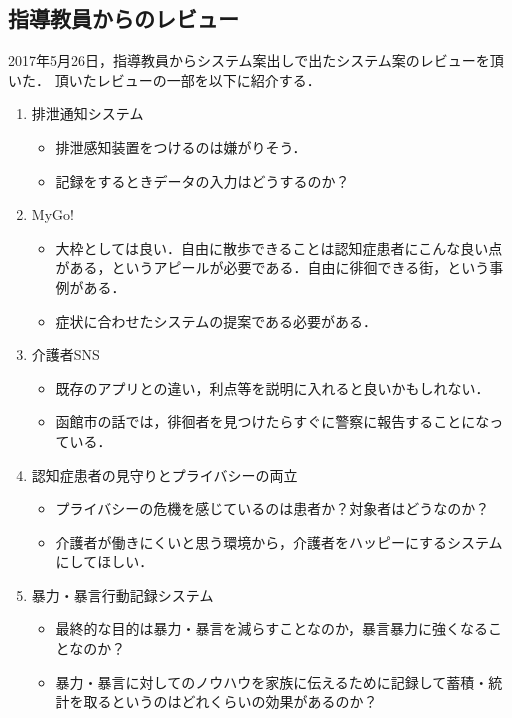 \documentclass[../report]{subfiles}
\begin{document}
\subsection{指導教員からのレビュー}
2017年5月26日，指導教員からシステム案出しで出たシステム案のレビューを頂いた．
頂いたレビューの一部を以下に紹介する．
\begin{enumerate}
    \item 排泄通知システム
        \begin{itemize}
            \item 排泄感知装置をつけるのは嫌がりそう．
            \item 記録をするときデータの入力はどうするのか？
        \end{itemize}
    \item MyGo!
        \begin{itemize}
            \item 大枠としては良い．自由に散歩できることは認知症患者にこんな良い点がある，というアピールが必要である．自由に徘徊できる街，という事例がある\cite{haikai}．
            \item 症状に合わせたシステムの提案である必要がある．
        \end{itemize}
    \item 介護者SNS
        \begin{itemize}
            \item 既存のアプリとの違い，利点等を説明に入れると良いかもしれない．
            \item 函館市の話では，徘徊者を見つけたらすぐに警察に報告することになっている．
        \end{itemize}
    \item 認知症患者の見守りとプライバシーの両立
        \begin{itemize}
            \item プライバシーの危機を感じているのは患者か？対象者はどうなのか？
            \item 介護者が働きにくいと思う環境から，介護者をハッピーにするシステムにしてほしい．
        \end{itemize}
    \item 暴力・暴言行動記録システム
        \begin{itemize}
            \item 最終的な目的は暴力・暴言を減らすことなのか，暴言暴力に強くなることなのか？
            \item 暴力・暴言に対してのノウハウを家族に伝えるために記録して蓄積・統計を取るというのはどれくらいの効果があるのか？
        \end{itemize}
\end{enumerate}
\end{document}
